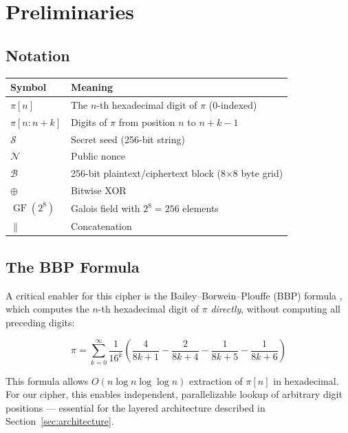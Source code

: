 \documentclass[12pt, a4paper]{article}
\DeclareMathOperator{\GF}{GF}
\newcommand{\seed}{\mathcal{S}}
\newcommand{\block}{\mathcal{B}}
\begin{document}
\section{Preliminaries}

\subsection{Notation}

\begin{center}
\renewcommand{\arraystretch}{1.4}
\begin{tabular}{ll}
\toprule
\textbf{Symbol} & \textbf{Meaning} \\
\midrule
$\pi[n]$ & The $n$-th hexadecimal digit of $\pi$ (0-indexed) \\
$\pi[n:n+k]$ & Digits of $\pi$ from position $n$ to $n+k-1$ \\
$\seed$ & Secret seed (256-bit string) \\
$\mathcal{N}$ & Public nonce \\
$\block$ & 256-bit plaintext/ciphertext block (8$\times$8 byte grid) \\
$\oplus$ & Bitwise XOR \\
$\GF(2^8)$ & Galois field with $2^8 = 256$ elements \\
$\lVert$ & Concatenation \\
\bottomrule
\end{tabular}
\end{center}

\subsection{The BBP Formula}

A critical enabler for this cipher is the Bailey--Borwein--Plouffe (BBP) formula \cite{bbp1997}, which computes the $n$-th hexadecimal digit of $\pi$ \emph{directly}, without computing all preceding digits:

\begin{equation}
  \pi = \sum_{k=0}^{\infty} \frac{1}{16^k} \left( \frac{4}{8k+1} - \frac{2}{8k+4} - \frac{1}{8k+5} - \frac{1}{8k+6} \right)
\end{equation}

This formula allows $O(n \log n \log \log n)$ extraction of $\pi[n]$ in hexadecimal. For our cipher, this enables independent, parallelizable lookup of arbitrary digit positions — essential for the layered architecture described in Section~\ref{sec:architecture}.
\end{document}
